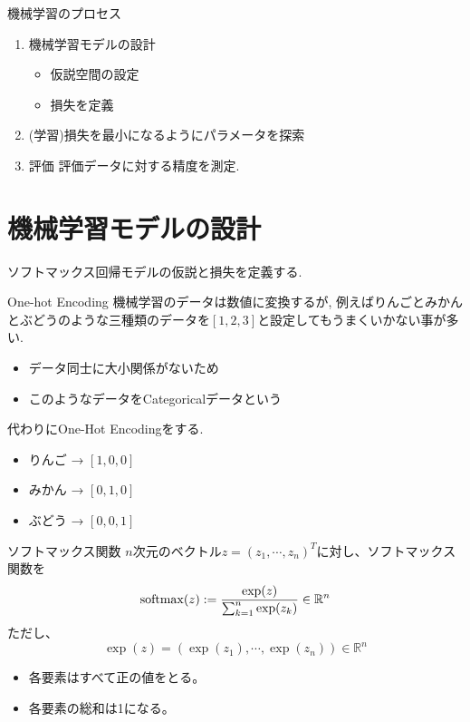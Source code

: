 \begin{frame}{機械学習のプロセス}
\begin{enumerate}
\item 機械学習モデルの設計
   \begin{itemize}
   \item 仮説空間の設定
   \item 損失を定義
   \end{itemize}
\item (学習)損失を最小になるようにパラメータを探索
\item 評価
   評価データに対する精度を測定.
\end{enumerate}
\end{frame}

\section{機械学習モデルの設計}
ソフトマックス回帰モデルの仮説と損失を定義する.

\begin{frame}{One-hot Encoding}
機械学習のデータは数値に変換するが,
例えばりんごとみかんとぶどうのような三種類のデータを$[1, 2, 3]$と設定してもうまくいかない事が多い.
\begin{itemize}
  \item データ同士に大小関係がないため
  \item このようなデータをCategoricalデータという
\end{itemize}
代わりにOne-Hot Encodingをする.
\begin{itemize}
  \item りんご →  $[1, 0, 0]$
  \item みかん → $[0, 1, 0]$
  \item ぶどう → $[0, 0, 1]$
\end{itemize}
\end{frame}

\begin{frame}{ソフトマックス関数}
$n$次元のベクトル$z=(z_1,\cdots,z_n)^T$に対し、ソフトマックス関数を
\begin{eqnarray*}
{\rm softmax}(z) := \frac{\exp(z)}{\sum_{k=1}^{n}\exp(z_{k}) } \in \mathbb{R}^n
\end{eqnarray*}
ただし、
\begin{equation*}
  \exp(z) = (\exp(z_1), \cdots, \exp(z_n)) \in \mathbb{R}^n
\end{equation*}
\begin{itemize}
\item 各要素はすべて正の値をとる。
\item 各要素の総和は1になる。
\end{itemize}
\end{frame}


